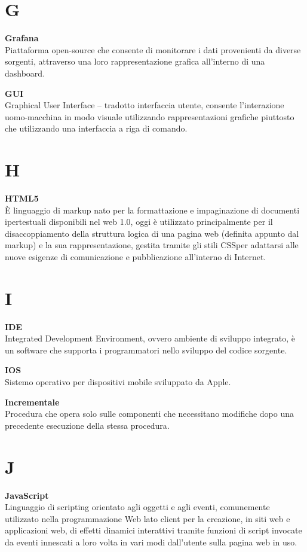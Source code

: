 \documentclass[a4paper, oneside, openany, dvipsnames, table, 12pt]{article}
\begin{document}
\newpage
\section{G}
\textbf{Grafana} \\
Piattaforma open-source che consente di monitorare i dati provenienti da diverse sorgenti, attraverso una loro rappresentazione grafica all'interno di una
dashboard.

\textbf{GUI} \\
Graphical User Interface – tradotto interfaccia utente, consente l’interazione uomo-macchina in modo visuale utilizzando rappresentazioni grafiche piuttosto che utilizzando una interfaccia a riga di comando.

\newpage
\section{H}
\textbf{HTML5}\\	
\`E linguaggio di markup nato per la formattazione e impaginazione di documenti ipertestuali disponibili nel web 1.0, oggi è utilizzato principalmente per il disaccoppiamento della struttura logica di una pagina web (definita appunto dal markup) e la sua rappresentazione, gestita tramite gli stili CSS\glo per adattarsi alle nuove esigenze di comunicazione e pubblicazione all'interno di Internet.

\newpage
\section{I}

\textbf{IDE} \\
Integrated Development Environment, ovvero ambiente di sviluppo integrato, è un software che supporta i programmatori nello sviluppo del codice sorgente. 

\textbf{IOS} \\
Sistemo operativo per dispositivi mobile sviluppato da Apple.

\textbf{Incrementale} \\
Procedura che opera solo sulle componenti che necessitano modifiche dopo una precedente esecuzione della stessa procedura.

\newpage
\section{J}
\textbf{JavaScript}\\	
Linguaggio di scripting orientato agli oggetti e agli eventi, comunemente utilizzato nella programmazione Web lato client per la creazione, in siti web e applicazioni web, di effetti dinamici interattivi tramite funzioni di script invocate da eventi innescati a loro volta in vari modi dall'utente sulla pagina web in uso.
\end{document}
